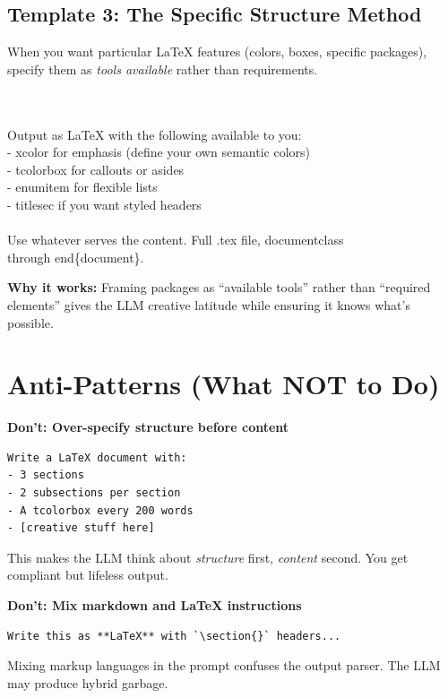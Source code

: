 \documentclass[11pt,letterpaper]{article}
\begin{document}
\subsection{Template 3: The Specific Structure Method}

When you want particular LaTeX features (colors, boxes, specific packages), specify them as \textit{tools available} rather than requirements.

\begin{tcolorbox}\\
\\
Output as LaTeX with the following available to you:\\
- xcolor for emphasis (define your own semantic colors)\\
- tcolorbox for callouts or asides\\
- enumitem for flexible lists\\
- titlesec if you want styled headers\\
\\
Use whatever serves the content. Full .tex file, documentclass \\
through end\{document\}.
\end{tcolorbox}

\begin{tcolorbox}[successbox]
\textbf{Why it works:} Framing packages as ``available tools'' rather than ``required elements'' gives the LLM creative latitude while ensuring it knows what's possible.
\end{tcolorbox}

\section{Anti-Patterns (What NOT to Do)}

\begin{tcolorbox}[warnbox]
\textbf{Don't: Over-specify structure before content}

\begin{Verbatim}[fontsize=\small]
Write a LaTeX document with:
- 3 sections
- 2 subsections per section  
- A tcolorbox every 200 words
- [creative stuff here]
\end{Verbatim}

This makes the LLM think about \textit{structure} first, \textit{content} second. You get compliant but lifeless output.
\end{tcolorbox}

\begin{tcolorbox}[warnbox]
\textbf{Don't: Mix markdown and LaTeX instructions}

\begin{Verbatim}[fontsize=\small]
Write this as **LaTeX** with `\section{}` headers...
\end{Verbatim}

Mixing markup languages in the prompt confuses the output parser. The LLM may produce hybrid garbage.
\end{tcolorbox}
\end{document}

